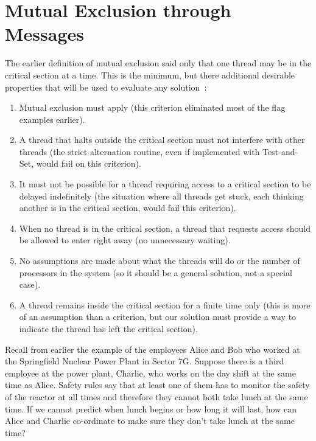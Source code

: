 




\section*{Mutual Exclusion through Messages}

The earlier definition of mutual exclusion said only that one thread may be in the critical section at a time. This is the minimum, but there additional desirable properties that will be used to evaluate any solution~\cite{osi}:
\begin{enumerate}
	\item Mutual exclusion must apply (this criterion eliminated most of the flag examples earlier).
	\item A thread that halts outside the critical section must not interfere with other threads (the strict alternation routine, even if implemented with Test-and-Set, would fail on this criterion).
	\item It must not be possible for a thread requiring access to a critical section to be delayed indefinitely (the situation where all threads get stuck, each thinking another is in the critical section, would fail this criterion).
	\item When no thread is in the critical section, a thread that requests access should be allowed to enter right away (no unnecessary waiting).
	\item No assumptions are made about what the threads will do or the number of processors in the system (so it should be a general solution, not a special case).
	\item A thread remains inside the critical section for a finite time only (this is more of an assumption than a criterion, but our solution must provide a way to indicate the thread has left the critical section).
\end{enumerate}

Recall from earlier the example of the employees Alice and Bob who worked at the Springfield Nuclear Power Plant in Sector 7G.  Suppose there is a third employee at the power plant, Charlie, who works on the day shift at the same time as Alice. Safety rules say that at least one of them has to monitor the safety of the reactor at all times and therefore they cannot both take lunch at the same time. If we cannot predict when lunch begins or how long it will last, how can Alice and Charlie co-ordinate to make sure they don't take lunch at the same time?

